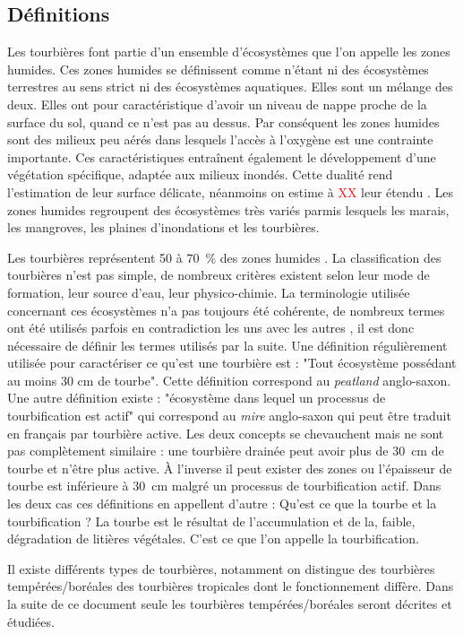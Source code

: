 \subsection{Définitions}
Les tourbières font partie d'un ensemble d'écosystèmes que l'on appelle les zones humides.
Ces zones humides se définissent comme n'étant ni des écosystèmes terrestres au sens strict ni des écosystèmes aquatiques.
Elles sont un mélange des deux.
Elles ont pour caractéristique d'avoir un niveau de nappe proche de la surface du sol, quand ce n'est pas au dessus.
Par conséquent les zones humides sont des milieux peu aérés dans lesquels l'accès à l'oxygène est une contrainte importante.
Ces caractéristiques entraînent également le développement d'une végétation spécifique, adaptée aux milieux inondés.
Cette dualité rend l'estimation de leur surface délicate, néanmoins on estime à \textcolor{red}{XX} leur étendu \plop.
Les zones humides regroupent des écosystèmes très variés parmis lesquels les marais, les mangroves, les plaines d'inondations et les tourbières.

Les tourbières représentent 50 à \SI{70}{\percent} des zones humides \cite{francez2000,joosten2002}.
La classification des tourbières n'est pas simple, de nombreux critères existent selon leur mode de formation, leur source d'eau, leur physico-chimie.
La terminologie utilisée concernant ces écosystèmes n'a pas toujours été cohérente, de nombreux termes ont été utilisés parfois en contradiction les uns avec les autres \cite{joosten2002}, il est donc nécessaire de définir les termes utilisés par la suite. 
Une définition régulièrement utilisée pour caractériser ce qu'est une tourbière est : "Tout écosystème possédant au moins 30 cm de tourbe".
Cette définition correspond au \textit{peatland} anglo-saxon.
Une autre définition existe  : "écosystème dans lequel un processus de tourbification est actif" qui correspond au \textit{mire} anglo-saxon qui peut être traduit en français par tourbière active.
Les deux concepts se chevauchent mais ne sont pas complètement similaire : une tourbière drainée peut avoir plus de \SI{30}{cm} de tourbe et n'être plus active.
À l'inverse il peut exister des zones ou l'épaisseur de tourbe est inférieure à \SI{30}{cm} malgré un processus de tourbification actif.
Dans les deux cas ces définitions en appellent d'autre : Qu'est ce que la tourbe et la tourbification ?
La tourbe est le résultat de l'accumulation et de la, faible, dégradation de litières végétales.
C'est ce que l'on appelle la tourbification.

Il existe différents types de tourbières, notamment on distingue des tourbières tempérées/boréales des tourbières tropicales dont le fonctionnement diffère.
Dans la suite de ce document seule les tourbières tempérées/boréales seront décrites et étudiées.

